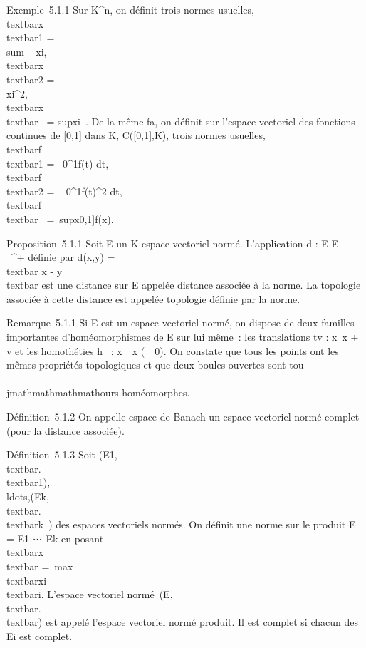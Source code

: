 Exemple~5.1.1 Sur K^n, on définit trois normes usuelles,
\\textbar{}x\\textbar{}1
= \\sum ~
\textbar{}xi\textbar{},
\\textbar{}x\\textbar{}2 =
\sqrt\\\sum
 \textbar{}xi\textbar{}^2,
\\textbar{}x\\textbar{}\infty~
= sup\textbar{}xi~\textbar{}. De la
même fa\ccon, on définit sur l'espace vectoriel des
fonctions continues de {[}0,1{]} dans K, C({[}0,1{]},K), trois normes
usuelles,
\\textbar{}f\\textbar{}1
=\int ~
0^1\textbar{}f(t)\textbar{} dt,
\\textbar{}f\\textbar{}2 =
\sqrt\int ~
0^1\textbar{}f(t)\textbar{}^2 dt,
\\textbar{}f\\textbar{}\infty~
=\
supx\in{[}0,1{]}\textbar{}f(x)\textbar{}.

Proposition~5.1.1 Soit E un K-espace vectoriel normé. L'application d :
E \times E \rightarrow~ \mathbb{R}~^+ définie par d(x,y) =\\textbar{} x
- y\\textbar{} est une distance sur E appelée distance
associée à la norme. La topologie associée à cette distance est appelée
topologie définie par la norme.

Remarque~5.1.1 Si E est un espace vectoriel normé, on dispose de deux
familles importantes d'homéomorphismes de E sur lui même~: les
translations tv : x\mapsto~x + v et les
homothéties h\lambda~ : x\mapsto~\lambda~x
(\lambda~\neq~0). On constate que tous les points ont
les mêmes propriétés topologiques et que deux boules ouvertes sont
tou\\\\jmathmathmathmathours homéomorphes.

Définition~5.1.2 On appelle espace de Banach un espace vectoriel normé
complet (pour la distance associée).

Définition~5.1.3 Soit
(E1,\\textbar{}.\\textbar{}1),\\ldots,(Ek,\\textbar{}.\\textbar{}k~)
des espaces vectoriels normés. On définit une norme sur le produit E =
E1 \times⋯ \times Ek en posant
\\textbar{}x\\textbar{}
=\
max\\textbar{}xi\\textbar{}i.
L'espace vectoriel
normé~(E,\\textbar{}.\\textbar{}) est
appelé l'espace vectoriel normé produit. Il est complet si chacun des
Ei est complet.

